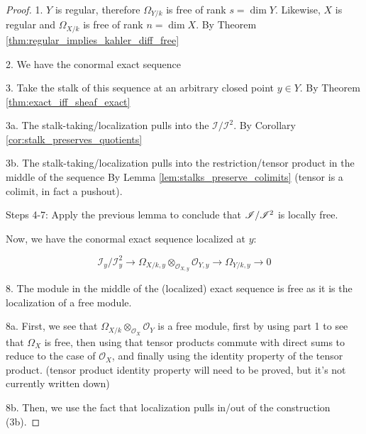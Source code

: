 \begin{corollary}
\begin{proof}

  1. $Y$ is regular, therefore 
     $\Omega_{Y/k}$ is free of rank
     $s = \dim Y$.
     Likewise, $X$ is regular and
     $\Omega_{X/k}$ is free of rank
     $n = \dim X$.
  By Theorem \ref{thm:regular_implies_kahler_diff_free}
  
  2. We have the conormal exact sequence

  3. Take the stalk of this sequence at an
     arbitrary closed point $y \in Y$.
     By Theorem \ref{thm:exact_iff_sheaf_exact}

  3a. The stalk-taking/localization
      pulls into the $\mathcal{I} / \mathcal{I}^2$.
      By Corollary \ref{cor:stalk_preserves_quotients}

  3b. The stalk-taking/localization
      pulls into the restriction/tensor product
      in the middle of the sequence
      By Lemma \ref{lem:stalks_preserve_colimits} 
      (tensor is a colimit, in fact a pushout).
  
  Steps 4-7: Apply the previous lemma to conclude that
  $\mathscr{I} / \mathscr{I}^{2}$ is locally free.

  Now, we have the conormal exact sequence localized at $y$:

  \[
    \mathcal{I}_y / \mathcal{I}^2_y 
    \to
    \Omega_{X/k,y} \otimes_{\mathcal{O}_{X,y}} \mathcal{O}_{Y,y} 
    \to
    \Omega_{Y/k,y} 
    \to 0
  \]

  8. The module in the middle of the (localized) exact sequence is free as it is 
     the localization of a free module. 

  8a. First, we see that $\Omega_{X/k} \otimes_{\mathcal{O}_X} \mathcal{O}_Y$ is a free module,
      first by using part 1 to see that $\Omega_X$ is free, then using that
      tensor products commute with direct sums to reduce to the case of $\mathcal{O}_X$,
      and finally using the identity property of the tensor product.
      (tensor product identity property will need to be proved, but it's not currently written down)

  8b. Then, we use the fact that localization pulls in/out of the construction (3b).


\end{proof}
\end{corollary}
